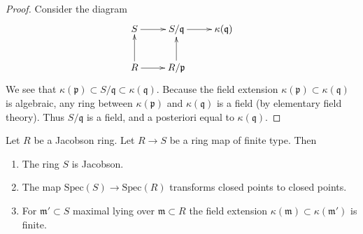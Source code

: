 \begin{proof}
Consider the diagram
$$
\xymatrix{
S \ar[r] & S/\mathfrak q \ar[r] & \kappa(\mathfrak q) \\
R \ar[r] \ar[u] & R/\mathfrak p \ar[u]
}
$$
We see that $\kappa(\mathfrak p) \subset S/\mathfrak q \subset
\kappa(\mathfrak q)$. Because the field extension
$\kappa(\mathfrak p) \subset \kappa(\mathfrak q)$
is algebraic, any ring between $\kappa(\mathfrak p)$
and $\kappa(\mathfrak q)$ is a field (by elementary
field theory). Thus $S/\mathfrak q$ is a field, and a posteriori equal
to $\kappa(\mathfrak q)$.
\end{proof}

\begin{proposition}
\label{proposition-Jacobson-permanence}
Let $R$ be a Jacobson ring. Let $R \to S$ be a
ring map of finite type. Then
\begin{enumerate}
\item The ring $S$ is Jacobson.
\item The map $\text{Spec}(S) \to \text{Spec}(R)$ transforms
closed points to closed points.
\item For $\mathfrak m' \subset S$ maximal lying over $\mathfrak m \subset R$
the field extension $\kappa(\mathfrak m) \subset \kappa(\mathfrak m')$
is finite.
\end{enumerate}
\end{proposition}


